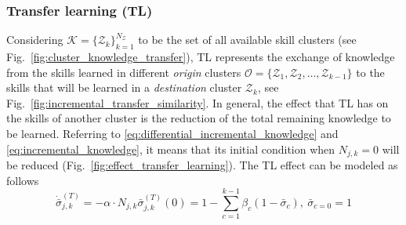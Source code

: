 \subsubsection{\textbf{Transfer learning (TL)}}

Considering $\mathcal{K} = \{ \mathcal{Z}_k \}^{N_\mathcal{Z}}_{k=1}$ to be the set of all available skill clusters (see Fig.~\ref{fig:cluster_knowledge_transfer}), TL represents the exchange of knowledge from the skills learned in different \emph{origin} clusters $\mathcal{O} = \{ \mathcal{Z}_1,\mathcal{Z}_2,\ldots,\mathcal{Z}_{k-1} \}$ to the skills that will be learned in a \emph{destination} cluster $\mathcal{Z}_k$, see Fig.~\ref{fig:incremental_transfer_similarity}. In general, the effect that TL has on the skills of another cluster is the reduction of the total remaining knowledge to be learned. Referring to \eqref{eq:differential_incremental_knowledge} and \eqref{eq:incremental_knowledge}, it means that its initial condition when $N_{j,k} = 0$ will be reduced (Fig.~\ref{fig:effect_transfer_learning}). The TL effect can be modeled as follows
\begin{subequations}\label{eq:joint_cartesian_acceleration}
	\begin{equation}\label{eq:joint_cartesian_acceleration_child}
		\dot{\bar{\sigma}}^{(T)}_{j,k} = -\alpha  \cdot N_{j,k}
	\end{equation}    
	\begin{equation}\label{eq:joint_cartesian_acceleration_parent}
		\bar{\sigma}^{(T)}_{j,k}(0) = 1 - \sum\limits_{c = 1}^{k-1}\beta_{c} \left( 1 - \bar{\sigma}_{c} \right),~\bar{\sigma}_{c=0} = 1
	\end{equation}
\end{subequations}
